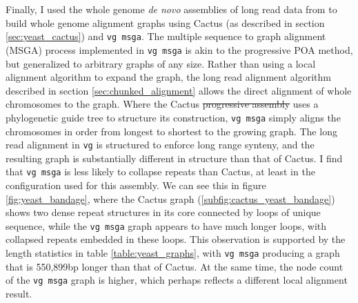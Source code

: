 \documentclass[a4paper,12pt,numbered,oneside]{Classes/PhDThesisPSnPDF}
\providecommand{\DIFaddtex}[1]{{\protect\color{blue}\uwave{#1}}} %
\providecommand{\DIFdeltex}[1]{{\protect\color{red}\sout{#1}}}                      %
\providecommand{\DIFaddbegin}{} %
\providecommand{\DIFaddend}{} %
\providecommand{\DIFdelbegin}{} %
\providecommand{\DIFdelend}{} %
\providecommand{\DIFadd}[1]{\texorpdfstring{\DIFaddtex{#1}}{#1}} %
\providecommand{\DIFdel}[1]{\texorpdfstring{\DIFdeltex{#1}}{}} %
\begin{document}
Finally, I used the whole genome \emph{de novo} assemblies of long read data from \cite{yue2017contrasting} to build whole genome alignment graphs using Cactus (as described in section \ref{sec:yeast_cactus}) and {\tt vg msga}.
The multiple sequence to graph alignment (MSGA) process implemented in {\tt vg msga} is akin to the progressive POA method, but generalized to arbitrary graphs of any size.
Rather than using a local alignment algorithm to expand the graph, the long read alignment algorithm described in section \ref{sec:chunked_alignment} allows the direct alignment of whole chromosomes to the graph.
Where the Cactus \DIFdelbegin \DIFdel{progressive assembly }\DIFdelend \DIFaddbegin \DIFadd{variation graph }\DIFaddend uses a phylogenetic guide tree to structure its construction, {\tt vg msga} simply aligns the chromosomes in order from longest to shortest to the growing graph.
The long read alignment in {\tt vg} is structured to enforce long range synteny, and the resulting graph is substantially different in structure than that of Cactus.
I find that {\tt vg msga} is less likely to collapse repeats than Cactus, at least in the configuration used for this assembly.
We can see this in figure \ref{fig:yeast_bandage}, where the Cactus \DIFaddbegin \DIFadd{variation }\DIFaddend graph (\ref{subfig:cactus_yeast_bandage}) shows two dense repeat structures in its core connected by loops of unique sequence, while the {\tt vg msga} graph appears to have much longer loops, with collapsed repeats embedded in these loops.
This observation is supported by the length statistics in table \ref{table:yeast_graphs}, with {\tt vg msga} producing a graph that is 550,899bp longer than that of Cactus.
At the same time, the node count of the {\tt vg msga} graph is higher, which perhaps reflects a different local alignment result.
\end{document}
